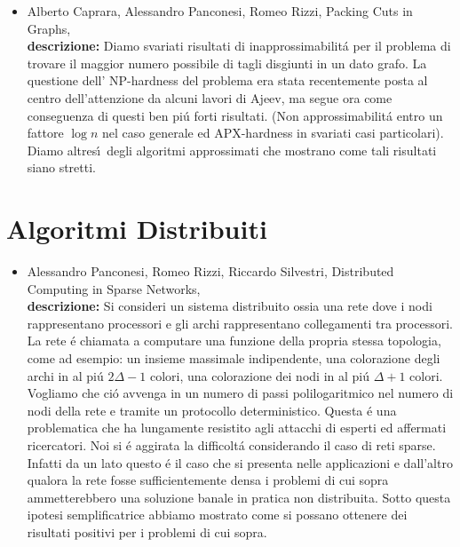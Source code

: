 \documentclass[10pt]{article}
\begin{document}
\begin{itemize}
  \vspace{1.4mm}
  \item[] {\sc Alberto Caprara, Alessandro Panconesi, Romeo Rizzi},
   \newblock  Packing Cuts in Graphs,
   \\
{\bf descrizione:}
Diamo svariati risultati di inapprossimabilit\'a
per il problema di trovare il maggior numero possibile di
tagli disgiunti in un dato grafo.
La questione dell' NP-hardness del problema
era stata recentemente posta al centro dell'attenzione
da alcuni lavori di Ajeev,
ma segue ora come conseguenza di questi ben pi\'u forti risultati.
(Non approssimabilit\'a entro un fattore $\log n$ nel caso generale
ed APX-hardness in svariati casi particolari).
Diamo altres\'\i\ degli algoritmi approssimati che mostrano
come tali risultati siano stretti.\\
\end{itemize}



\section{Algoritmi Distribuiti}

\begin{itemize}
  \vspace{1.4mm}
  \item[] {\sc Alessandro Panconesi, Romeo Rizzi, Riccardo Silvestri},
   \newblock  Distributed Computing in Sparse Networks,
   \\
{\bf descrizione:}
Si consideri un sistema distribuito
ossia una rete dove i nodi rappresentano processori
e gli archi rappresentano collegamenti tra processori.
La rete \'e chiamata a computare
una funzione della propria stessa topologia,
come ad esempio:
un insieme
massimale indipendente,
una colorazione degli archi in al pi\'u $2\Delta -1$ colori,
una colorazione dei nodi in al pi\'u $\Delta +1$ colori.
Vogliamo che ci\'o avvenga in un numero di passi
polilogaritmico nel numero di nodi della rete
e tramite un protocollo deterministico.
Questa \'e una problematica che ha lungamente resistito
agli attacchi di esperti ed affermati ricercatori.
Noi si \'e aggirata la difficolt\'a considerando
il caso di reti sparse.
Infatti da un lato questo \'e il caso che
si presenta nelle applicazioni
e dall'altro qualora la rete fosse sufficientemente densa
i problemi di cui sopra ammetterebbero una soluzione
banale in pratica non distribuita.
Sotto questa ipotesi semplificatrice abbiamo mostrato
come si possano ottenere dei risultati positivi
per i problemi di cui sopra.\\

\end{itemize}
\end{document}
